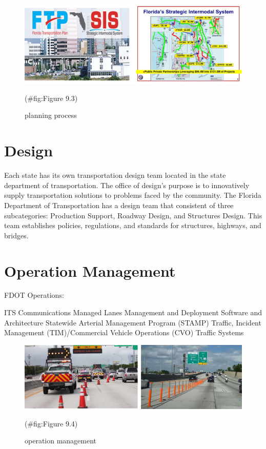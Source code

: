 \documentclass[
]{book}
\begin{document}
\begin{figure}

{\centering \includegraphics{./Images/planning design/planning process} 

}

\caption{planning process}(\#fig:Figure 9.3)
\end{figure}

\hypertarget{planning-design}{%
\section{Design}\label{planning-design}}

Each state has its own transportation design team located in the state department of transportation.
The office of design's purpose is to innovatively supply transportation solutions to problems faced by the community.
The Florida Department of Transportation has a design team that consistent of three subcategories: Production Support, Roadway Design, and Structures Design.
This team establishes policies, regulations, and standards for structures, highways, and bridges.

\hypertarget{planning-operation}{%
\section{Operation Management}\label{planning-operation}}

FDOT Operations:

ITS Communications
Managed Lanes
Management and Deployment
Software and Architecture
Statewide Arterial Management Program (STAMP)
Traffic, Incident Management (TIM)/Commercial Vehicle Operations (CVO)
Traffic Systems

\begin{figure}

{\centering \includegraphics{./Images/planning design/operation management} 

}

\caption{operation management}(\#fig:Figure 9.4)
\end{figure}
\end{document}
